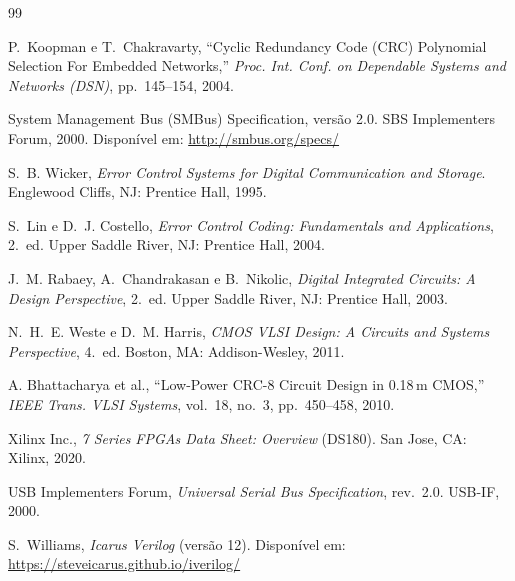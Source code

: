 \documentclass[12pt,a4paper]{article}
\begin{document}
\begin{thebibliography}{99}

  P.~Koopman e T.~Chakravarty,
  ``Cyclic Redundancy Code (CRC) Polynomial Selection For Embedded Networks,''
  \textit{Proc. Int. Conf. on Dependable Systems and Networks (DSN)},
  pp.~145--154, 2004.

  System Management Bus (SMBus) Specification, versão 2.0.
  SBS Implementers Forum, 2000.
  Disponível em: \url{http://smbus.org/specs/}

  S.~B. Wicker,
  \textit{Error Control Systems for Digital Communication and Storage}.
  Englewood Cliffs, NJ: Prentice Hall, 1995.

  S.~Lin e D.~J. Costello,
  \textit{Error Control Coding: Fundamentals and Applications}, 2.~ed.
  Upper Saddle River, NJ: Prentice Hall, 2004.

  J.~M. Rabaey, A.~Chandrakasan e B.~Nikolic,
  \textit{Digital Integrated Circuits: A Design Perspective}, 2.~ed.
  Upper Saddle River, NJ: Prentice Hall, 2003.

  N.~H.~E. Weste e D.~M. Harris,
  \textit{CMOS VLSI Design: A Circuits and Systems Perspective}, 4.~ed.
  Boston, MA: Addison-Wesley, 2011.

  A. Bhattacharya et al.,
  ``Low-Power CRC-8 Circuit Design in 0.18\,\textmu m CMOS,''
  \textit{IEEE Trans. VLSI Systems}, vol.~18, no.~3, pp.~450--458, 2010.

  Xilinx Inc.,
  \textit{7 Series FPGAs Data Sheet: Overview} (DS180).
  San Jose, CA: Xilinx, 2020.

  USB Implementers Forum,
  \textit{Universal Serial Bus Specification}, rev.\ 2.0.
  USB-IF, 2000.

  S.~Williams,
  \textit{Icarus Verilog} (versão 12).
  Disponível em: \url{https://steveicarus.github.io/iverilog/}

\end{thebibliography}
\end{document}
